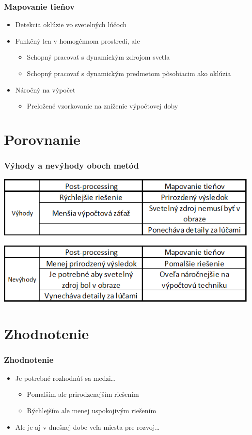 \documentclass{beamer}
\begin{document}
\begin{frame}[fragile=singleslide]\frametitle{Mapovanie tieňov}
\begin{itemize}
\item Detekcia oklúzie vo svetelných lúčoch
\item Funkčný len v homogénnom prostredí, ale
	\begin{itemize}
	\item Schopný pracovať s dynamickým zdrojom svetla
	\item Schopný pracovať s dynamickým predmetom pôsobiacim ako oklúzia
	\end{itemize}
\item Náročný na výpočet
\begin{itemize}
	\item Preložené vzorkovanie na zníženie výpočtovej doby
	\end{itemize}
\end{itemize}
\end{frame}

\section{Porovnanie}

\begin{frame}[fragile=singleslide]\frametitle{Výhody a nevýhody oboch metód}
\begin{center}
\includegraphics[scale=.65]{tabulla.png}
\end{center}
\end{frame}


\section*{Zhodnotenie}

\begin{frame}[fragile=singleslide]\frametitle{Zhodnotenie}
\begin{itemize}
\item Je potrebné rozhodnúť sa medzi\ldots{}
    \begin{itemize}
    \item Pomalším ale prirodzenejším riešením
    \item Rýchlejším ale menej uspokojivým riešením
    \end{itemize}
\item Ale je aj v dnešnej dobe veľa miesta pre rozvoj\ldots{}
\end{itemize}
\end{frame}
\end{document}
